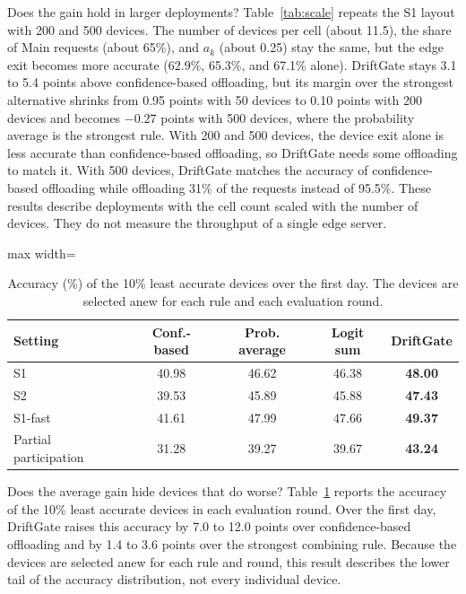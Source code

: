 Does the gain hold in larger deployments? Table~\ref{tab:scale} repeats the S1 layout with 200 and 500 devices. The number of devices per cell (about 11.5), the share of Main requests (about 65\%), and $a_k$ (about 0.25) stay the same, but the edge exit becomes more accurate (62.9\%, 65.3\%, and 67.1\% alone). DriftGate stays 3.1 to 5.4 points above confidence-based offloading, but its margin over the strongest alternative shrinks from 0.95 points with 50 devices to 0.10 points with 200 devices and becomes $-0.27$ points with 500 devices, where the probability average is the strongest rule. With 200 and 500 devices, the device exit alone is less accurate than confidence-based offloading, so DriftGate needs some offloading to match it. With 500 devices, DriftGate matches the accuracy of confidence-based offloading while offloading 31\% of the requests instead of 95.5\%. These results describe deployments with the cell count scaled with the number of devices. They do not measure the throughput of a single edge server.

\begin{table}[t]
\centering
\caption{Accuracy (\%) of the 10\% least accurate devices over the first day. The devices are selected anew for each rule and each evaluation round.}
\label{tab:bottom}
\begin{adjustbox}{max width=\columnwidth}
\begin{tabular}{lcccc}
\toprule
Setting & Conf.-based & Prob. average & Logit sum & DriftGate \\
\midrule
S1 & 40.98 & 46.62 & 46.38 & \textbf{48.00} \\
S2 & 39.53 & 45.89 & 45.88 & \textbf{47.43} \\
S1-fast & 41.61 & 47.99 & 47.66 & \textbf{49.37} \\
Partial participation & 31.28 & 39.27 & 39.67 & \textbf{43.24} \\
\bottomrule
\end{tabular}
\end{adjustbox}
\end{table}

Does the average gain hide devices that do worse? Table~\ref{tab:bottom} reports the accuracy of the 10\% least accurate devices in each evaluation round. Over the first day, DriftGate raises this accuracy by 7.0 to 12.0 points over confidence-based offloading and by 1.4 to 3.6 points over the strongest combining rule. Because the devices are selected anew for each rule and round, this result describes the lower tail of the accuracy distribution, not every individual device.

